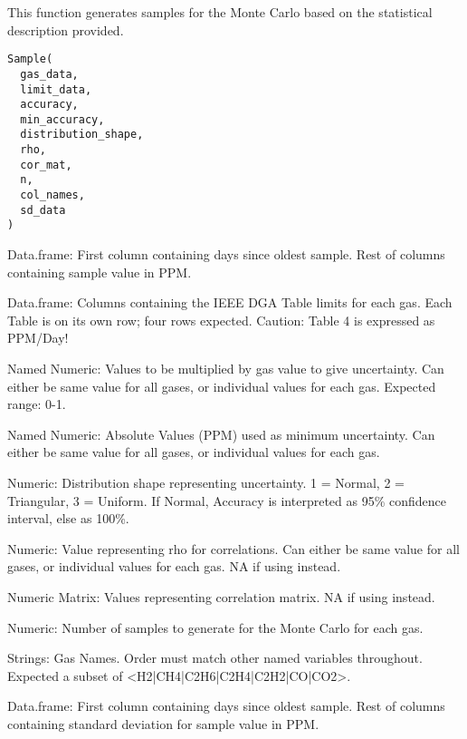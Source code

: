 \documentclass[a4paper]{book}
\begin{document}
%
\begin{Description}
This function generates samples for the Monte Carlo based on the statistical description provided.
\end{Description}
%
\begin{Usage}
\begin{verbatim}
Sample(
  gas_data,
  limit_data,
  accuracy,
  min_accuracy,
  distribution_shape,
  rho,
  cor_mat,
  n,
  col_names,
  sd_data
)
\end{verbatim}
\end{Usage}
%
\begin{Arguments}
\begin{ldescription}
\item[\code{gas\_data}] Data.frame: First column containing days since oldest sample. Rest of columns containing sample value in PPM.

\item[\code{limit\_data}] Data.frame: Columns containing the IEEE DGA Table limits for each gas. Each Table is on its own row; four rows expected. Caution: Table 4 is expressed as PPM/Day!

\item[\code{accuracy}] Named Numeric: Values to be multiplied by gas value to give uncertainty. Can either be same value for all gases, or individual values for each gas. Expected range: 0-1.

\item[\code{min\_accuracy}] Named Numeric: Absolute Values (PPM) used as minimum uncertainty. Can either be same value for all gases, or individual values for each gas.

\item[\code{distribution\_shape}] Numeric: Distribution shape representing uncertainty. 1 = Normal, 2 = Triangular, 3 = Uniform. If Normal, Accuracy is interpreted as 95\% confidence interval, else as 100\%.

\item[\code{rho}] Numeric: Value representing rho for correlations. Can either be same value for all gases, or individual values for each gas. NA if using  instead.

\item[\code{cor\_mat}] Numeric Matrix: Values representing correlation matrix. NA if using  instead.

\item[\code{n}] Numeric: Number of samples to generate for the Monte Carlo for each gas.

\item[\code{col\_names}] Strings: Gas Names. Order must match other named variables throughout. Expected a subset of <H2|CH4|C2H6|C2H4|C2H2|CO|CO2>.

\item[\code{sd\_data}] Data.frame: First column containing days since oldest sample. Rest of columns containing standard deviation for sample value in PPM.
\end{ldescription}
\end{Arguments}
\end{document}
